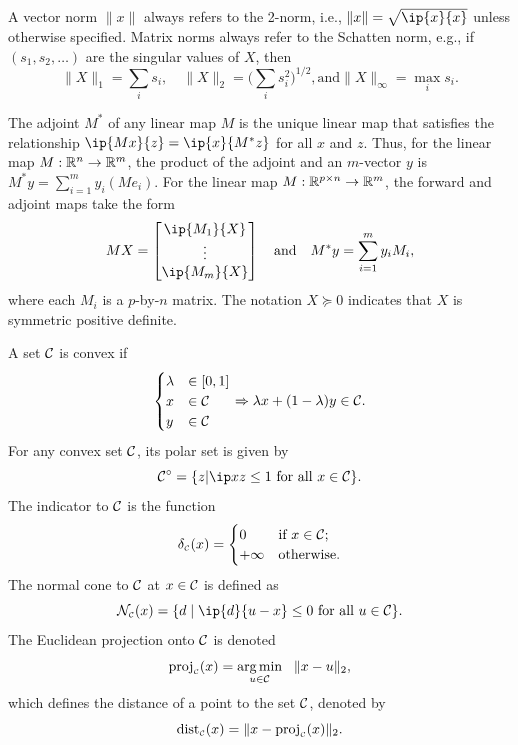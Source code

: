 A vector norm $\|x\|$ always refers to the 2-norm, i.e., $\|x\| = \sqrt{\ip{x}{x}}$ unless otherwise specified. Matrix norms always refer to the Schatten norm, e.g., if $(s_1, s_2,\ldots)$ are
the singular values of $X$, then
\[
  \|X\|_1 = \sum_i s_i,
  \quad \|X\|_2=\Big(\sum_i s_i^2\Big)^{1/2},
  \text{and} \|X\|_\infty=\max_i s_i.
\]

The adjoint $M^*$ of any linear map $M$ is the unique
linear map that satisfies the relationship $\ip{Mx}{z}=\ip{x}{M^*z}$ for all $x$ and $z$. Thus, for
the linear map $M:\mathbb{R}^n\to\mathbb{R}^m$, the product of the adjoint and an
$m$-vector $y$ is $M^*y = \sum_{i=1}^m y_i (Me_i)$. For the linear map
$M:\mathbb{R}^{p\times n}\to\mathbb{R}^m$, the forward and adjoint maps take the form
\begin{equation} \label{eq:mat-map}
  M X = \begin{bmatrix}
    \ip{M_1}{X} \\ \vdots \\ \ip{M_m}{X}
  \end{bmatrix}  
  \quad\mbox{and}\quad
  M^*y = \sum_{i=1}^m y_i M_i,
\end{equation}
where each $M_i$ is a $p$-by-$n$ matrix. The notation $X\succeq0$
indicates that $X$ is symmetric positive definite.

A set $\mathcal{C}$ is convex if
\[
    \begin{cases}
        \lambda &\in [0,1]\\
        x &\in \mathcal{C}\\
        y &\in \mathcal{C}
    \end{cases}
    \Rightarrow 
    \lambda x + (1-\lambda)y \in \mathcal{C}. 
\]
For any convex set $\mathcal{C}$, its polar set is given by 
\begin{equation} \label{eq-polar-set}
    \Cscr\polar=\{z | \ip x z \le 1 \mbox{\ for all\ } x\in\Cscr \}.
\end{equation}
The indicator to $\mathcal{C}$ is the
function
\[
  \delta_{\scriptscriptstyle\mathcal{C}}(x) = \begin{cases}
    0 & \mbox{if $x\in\mathcal{C}$;}
\\ +\infty & \mbox{otherwise}.
  \end{cases}
\]
The normal cone to $\mathcal{C}$ at $x\in\mathcal{C}$ is defined as
\[\Nscr\Cs(x) = \{d \mid \ip{d}{u - x} \leq 0 \mbox{ for all } u \in \Cscr\}.\]
The Euclidean projection onto $\mathcal{C}$ is denoted
\[\operatorname{proj}_{\scriptscriptstyle\mathcal{C}}(x) = \underset{u \in \mathcal{C}}{\textrm{arg}\,{\min}}\enskip \ \|x - u\|_2,\]
which defines the distance of a point to the set $\mathcal{C}$, denoted by
\[\operatorname{dist}_{\scriptscriptstyle\mathcal{C}}(x) = \|x - \operatorname{proj}_{\scriptscriptstyle\mathcal{C}}(x)\|_2.\]

